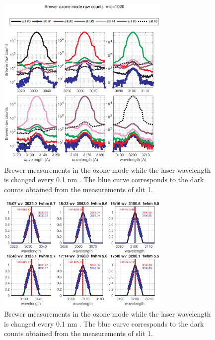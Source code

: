 \documentclass[acp, manuscript]{copernicus}
\begin{document}
\clearpage
%
\begin{figure}[t]
\includegraphics[width=8.3cm]{figures/General_laser_log.eps}
\caption{Brewer measurements in the ozone mode while the laser wavelength is changed every 0.1 nm . The blue curve corresponds to the dark counts obtained from the measurements of slit 1.}
\label{fig:laser_log}
\end{figure}

%
\clearpage
\begin{figure}[t]
\includegraphics[width=8.3cm]{figures/General_Laser_scan_dsp.eps}
\caption{Brewer measurements in the ozone mode while the laser wavelength is changed every 0.1 nm . The blue curve corresponds to the dark counts obtained from the measurements of slit 1.}
\label{fig:laser_dsp}
\end{figure}
\end{document}
